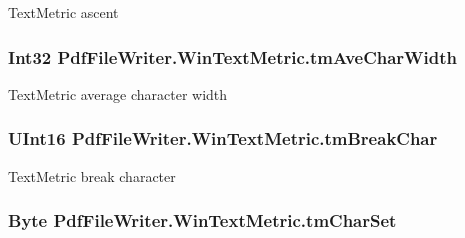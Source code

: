 Text\+Metric ascent 

\subsubsection[{\texorpdfstring{tm\+Ave\+Char\+Width}{tmAveCharWidth}}]{\setlength{\rightskip}{0pt plus 5cm}Int32 Pdf\+File\+Writer.\+Win\+Text\+Metric.\+tm\+Ave\+Char\+Width\hspace{0.3cm}{\ttfamily [get]}}\hypertarget{class_pdf_file_writer_1_1_win_text_metric_ad0b01b1e5cef573cda0f42b8ed9a40cd}{}\label{class_pdf_file_writer_1_1_win_text_metric_ad0b01b1e5cef573cda0f42b8ed9a40cd}


Text\+Metric average character width 

\subsubsection[{\texorpdfstring{tm\+Break\+Char}{tmBreakChar}}]{\setlength{\rightskip}{0pt plus 5cm}U\+Int16 Pdf\+File\+Writer.\+Win\+Text\+Metric.\+tm\+Break\+Char\hspace{0.3cm}{\ttfamily [get]}}\hypertarget{class_pdf_file_writer_1_1_win_text_metric_a8dc8f29e6957a7bd84b225861139b46c}{}\label{class_pdf_file_writer_1_1_win_text_metric_a8dc8f29e6957a7bd84b225861139b46c}


Text\+Metric break character 

\subsubsection[{\texorpdfstring{tm\+Char\+Set}{tmCharSet}}]{\setlength{\rightskip}{0pt plus 5cm}Byte Pdf\+File\+Writer.\+Win\+Text\+Metric.\+tm\+Char\+Set\hspace{0.3cm}{\ttfamily [get]}}\hypertarget{class_pdf_file_writer_1_1_win_text_metric_a8248eca35a5955b591a197131ed35657}{}\label{class_pdf_file_writer_1_1_win_text_metric_a8248eca35a5955b591a197131ed35657}


